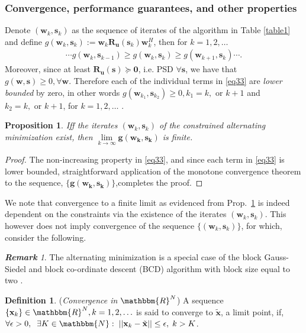 \documentclass[11pt,draftclsnofoot,onecolumn]{IEEEtran}
\newtheorem{prop}{\bf{Proposition}}
\theoremstyle{definition}
\newtheorem{defn}{\bf Definition}
\theoremstyle{remark}
\newtheorem{remk}{\bf Remark}
\begin{document}
\subsubsection{Convergence, performance guarantees, and other properties} Denote $(\mathbf{w}_k,\mathbf{s}_k)$ as the sequence of iterates of the algorithm in Table \ref{table1} and define $g(\mathbf{w}_k,\mathbf{s}_k):=\mathbf{w}_k\mathbf{R_u}(\mathbf{s}_k)\mathbf{w}_k^H$, then for $k=1,2,\ldots$
\begin{align} \label{eq33}
\cdots g(\mathbf{w}_k,\mathbf{s}_{k-1} )\geq g(\mathbf{w}_k,\mathbf{s}_k ) \geq g( \mathbf{w}_{k+1},\mathbf{s}_k)\cdots.
\end{align}
Moreover, since at least $\mathbf{R_u}(\mathbf{s})\succeq \mathbf{0}$, i.e. PSD $\forall\mathbf{s}$, we have that $g(\mathbf{w},\mathbf{s})\geq0,\forall\mathbf{w}$. Therefore each of the individual terms in \eqref{eq33} are {\it lower bounded} by zero, in other words $g(\mathbf{w}_{k_1},\mathbf{s}_{k_2})\geq0,k_1=k,\mbox{ or }k+1$ and $k_2=k,\mbox{ or }k+1$, for $k=1,2,\ldots$ .
\begin{prop} \label{propos4}
Iff the iterates $(\mathbf{w}_k,\mathbf{s}_k)$ of the constrained alternating minimization exist, then $\lim\limits_{k\rightarrow\infty}\mathbf{g ( \mathbf{w}_k,\mathbf{s}_k)}$ is finite.
\end{prop}
\begin{proof}
The non-increasing property in \eqref{eq33}, and since each term in \eqref{eq33} is lower bounded, straightforward application of the monotone convergence  theorem to the sequence, $\{\mathbf{g ( \mathbf{w}_k,\mathbf{s}_k)}\}$,completes the proof.
\end{proof}
We note that convergence to a finite limit as evidenced from Prop.~\ref{propos4} is indeed dependent on the constraints via the existence of the iterates $(\mathbf{w}_k,\mathbf{s}_k)$. This however does not imply convergence of the sequence $\{(\mathbf{w}_k,\mathbf{s}_k) \}$, for which, consider the following.
\begin{remk}\label{remark1}
The alternating minimization is a special case of the block Gauss-Siedel and block co-ordinate descent (BCD) algorithm with block size equal to two \cite{Grippo2000,Luo1992}.  
\end{remk}
\begin{defn} \label{deflimit} ({\it Convergence in $\mathbbm{R}^{N}$}) A sequence $\{ \mathbf{x}_k\} \in\mathbbm{R}^{N} ,k=1,2,\ldots$ is said to converge to $\tilde{\mathbf{x}}$, a limit point, if, $\forall \epsilon>0,\;\; \exists K\in{\mathbbm{N}}:\;||\mathbf{x}_k-\tilde{\mathbf{x}}|| \leq\epsilon,\; k>K$.
\end{defn}
\end{document}
